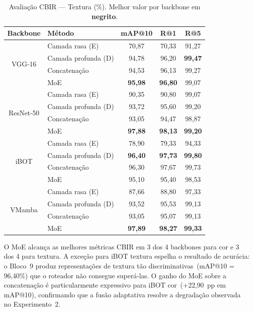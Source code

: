 \documentclass[conference]{IEEEtran}
\begin{document}
\begin{table}[htbp]
\caption{Avaliação CBIR --- Textura (\%). Melhor valor por backbone em
         \textbf{negrito}.}
\begin{center}
\begin{tabular}{c|l|c|c|c}
\hline
\textbf{Backbone} & \textbf{Método} & \textbf{mAP@10}
                  & \textbf{R@1} & \textbf{R@5} \\
\hline
\multirow{4}{*}{VGG-16}
  & Camada rasa (E)          & 70,87 & 70,33 & 91,27 \\
  & Camada profunda (D)      & 94,78 & 96,20 & \textbf{99,47} \\
  & Concatenação             & 94,53 & 96,13 & 99,27 \\
  & MoE                      & \textbf{95,98} & \textbf{96,80} & 99,07 \\
\hline
\multirow{4}{*}{ResNet-50}
  & Camada rasa (E)          & 90,35 & 90,80 & 99,07 \\
  & Camada profunda (D)      & 93,72 & 95,60 & 99,20 \\
  & Concatenação             & 93,05 & 94,47 & 98,87 \\
  & MoE                      & \textbf{97,88} & \textbf{98,13} & \textbf{99,20} \\
\hline
\multirow{4}{*}{iBOT}
  & Camada rasa (E)          & 78,90 & 79,33 & 94,33 \\
  & Camada profunda (D)      & \textbf{96,40} & \textbf{97,73} & \textbf{99,80} \\
  & Concatenação             & 96,30 & 97,67 & 99,73 \\
  & MoE                      & 95,10 & 95,40 & 98,53 \\
\hline
\multirow{4}{*}{VMamba}
  & Camada rasa (E)          & 87,66 & 88,80 & 97,33 \\
  & Camada profunda (D)      & 93,52 & 95,53 & 99,13 \\
  & Concatenação             & 93,05 & 95,07 & 99,13 \\
  & MoE                      & \textbf{97,89} & \textbf{98,27} & \textbf{99,33} \\
\hline
\end{tabular}
\label{tab_cbir_texture}
\end{center}
\end{table}

O MoE alcança as melhores métricas CBIR em 3 dos 4 backbones para cor
e 3 dos 4 para textura.
A exceção para iBOT textura espelha o resultado de acurácia: o Bloco~9
produz representações de textura tão discriminativas~(mAP@10 = 96,40\%)
que o roteador não consegue superá-las.
O ganho do MoE sobre a concatenação é particularmente expressivo para
iBOT cor~($+$22,90~pp em mAP@10), confirmando que a fusão adaptativa
resolve a degradação observada no Experimento~2.
\end{document}
